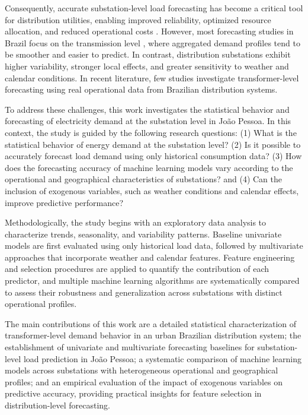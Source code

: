 Consequently, accurate substation-level load forecasting has become a critical tool for distribution utilities, enabling improved reliability, optimized resource allocation, and reduced operational costs \cite{AHMAD2022112128}. However, most forecasting studies in Brazil focus on the transmission level \cite{Aquila2023}, where aggregated demand profiles tend to be smoother and easier to predict. In contrast, distribution substations exhibit higher variability, stronger local effects, and greater sensitivity to weather and calendar conditions. In recent literature, few studies investigate transformer-level forecasting using real operational data from Brazilian distribution systems.

To address these challenges, this work investigates the statistical behavior and forecasting of electricity demand at the substation level in João Pessoa. In this context, the study is guided by the following research questions: 
(1) What is the statistical behavior of energy demand at the substation level? 
(2) Is it possible to accurately forecast load demand using only historical consumption data? 
(3) How does the forecasting accuracy of machine learning models vary according to the operational and geographical characteristics of substations? 
and (4) Can the inclusion of exogenous variables, such as weather conditions and calendar effects, improve predictive performance?

Methodologically, the study begins with an exploratory data analysis to characterize trends, seasonality, and variability patterns. Baseline univariate models are first evaluated using only historical load data, followed by multivariate approaches that incorporate weather and calendar features. Feature engineering and selection procedures are applied to quantify the contribution of each predictor, and multiple machine learning algorithms are systematically compared to assess their robustness and generalization across substations with distinct operational profiles.

The main contributions of this work are a detailed statistical characterization of transformer-level demand behavior in an urban Brazilian distribution system; the establishment of univariate and multivariate forecasting baselines for substation-level load prediction in João Pessoa; a systematic comparison of machine learning models across substations with heterogeneous operational and geographical profiles; and an empirical evaluation of the impact of exogenous variables on predictive accuracy, providing practical insights for feature selection in distribution-level forecasting.

